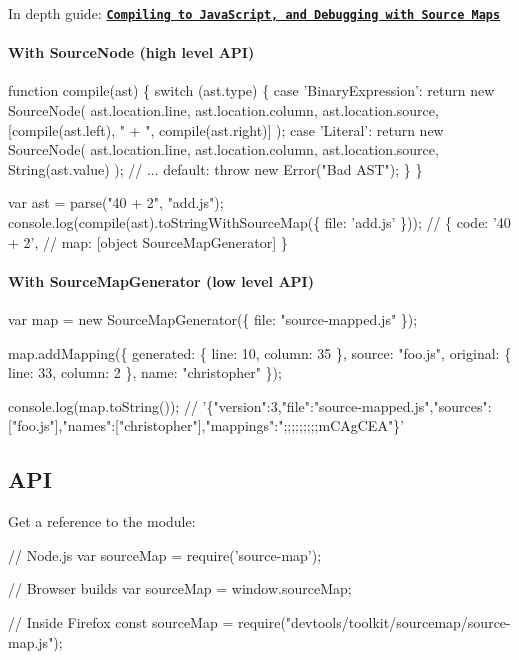 In depth guide\+: \href{https://hacks.mozilla.org/2013/05/compiling-to-javascript-and-debugging-with-source-maps/}{\tt {\bfseries Compiling to Java\+Script, and Debugging with Source Maps}}

\paragraph*{With Source\+Node (high level A\+PI)}


\begin{DoxyCode}
function compile(ast) \{
  switch (ast.type) \{
  case 'BinaryExpression':
    return new SourceNode(
      ast.location.line,
      ast.location.column,
      ast.location.source,
      [compile(ast.left), " + ", compile(ast.right)]
    );
  case 'Literal':
    return new SourceNode(
      ast.location.line,
      ast.location.column,
      ast.location.source,
      String(ast.value)
    );
  // ...
  default:
    throw new Error("Bad AST");
  \}
\}

var ast = parse("40 + 2", "add.js");
console.log(compile(ast).toStringWithSourceMap(\{
  file: 'add.js'
\}));
// \{ code: '40 + 2',
//   map: [object SourceMapGenerator] \}
\end{DoxyCode}


\paragraph*{With Source\+Map\+Generator (low level A\+PI)}


\begin{DoxyCode}
var map = new SourceMapGenerator(\{
  file: "source-mapped.js"
\});

map.addMapping(\{
  generated: \{
    line: 10,
    column: 35
  \},
  source: "foo.js",
  original: \{
    line: 33,
    column: 2
  \},
  name: "christopher"
\});

console.log(map.toString());
//
       '\{"version":3,"file":"source-mapped.js","sources":["foo.js"],"names":["christopher"],"mappings":";;;;;;;;;mCAgCEA"\}'
\end{DoxyCode}


\subsection*{A\+PI}

Get a reference to the module\+:


\begin{DoxyCode}
// Node.js
var sourceMap = require('source-map');

// Browser builds
var sourceMap = window.sourceMap;

// Inside Firefox
const sourceMap = require("devtools/toolkit/sourcemap/source-map.js");
\end{DoxyCode}



